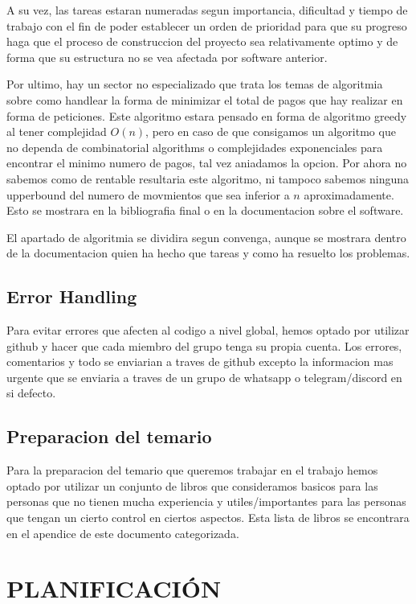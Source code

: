 \documentclass{article}
\theoremstyle{definition}
\begin{document}
A su vez, las tareas estaran numeradas segun importancia, dificultad y tiempo de trabajo con el fin de poder establecer un orden de prioridad para que su progreso haga que el proceso de construccion del proyecto sea relativamente optimo y de forma que su estructura no se vea afectada por software anterior.

Por ultimo, hay un sector no especializado que trata los temas de algoritmia sobre como handlear la forma de minimizar el total de pagos que hay realizar en forma de peticiones. Este algoritmo estara pensado en forma de algoritmo greedy al tener complejidad $O(n)$, pero en caso de que consigamos un algoritmo que no dependa de combinatorial algorithms o complejidades exponenciales para encontrar el minimo numero de pagos, tal vez aniadamos la opcion. Por ahora no sabemos como de rentable resultaria este algoritmo, ni tampoco sabemos ninguna upperbound del numero de movmientos que sea inferior a $n$ aproximadamente. Esto se mostrara en la bibliografia final o en la documentacion sobre el software.

El apartado de algoritmia se dividira segun convenga, aunque se mostrara dentro de la documentacion quien ha hecho que tareas y como ha resuelto los problemas.
\subsection{Error Handling}

Para evitar errores que afecten al codigo a nivel global, hemos optado por utilizar github y hacer que cada miembro del grupo tenga su propia cuenta. Los errores, comentarios y todo se enviarian a traves de github excepto la informacion mas urgente que se enviaria a traves de un grupo de whatsapp o telegram/discord en si defecto.

\subsection{Preparacion del temario}

Para la preparacion del temario que queremos trabajar en el trabajo hemos optado por utilizar un conjunto de libros que consideramos basicos para las personas que no tienen mucha experiencia y utiles/importantes para las personas que tengan un cierto control en ciertos aspectos. Esta lista de libros se encontrara en el apendice de este documento categorizada.


\section{PLANIFICACIÓN}
\end{document}
